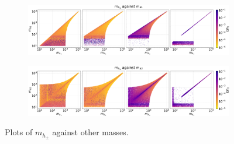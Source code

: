 \documentclass[12pt]{article}
\begin{document}
\begin{figure}[H]
    \begin{subfigure}[b]{\columnwidth}
      \centering
      \includegraphics[width=1\columnwidth]{4plot/MDP_MD1.pdf}
    \end{subfigure}

    \begin{subfigure}[b]{\columnwidth}
      \centering
      \includegraphics[width=1\columnwidth]{4plot/MDP_MD2.pdf}
    \end{subfigure}
    \caption{Plots of $m_{h_\pm}$ against other masses.}
\end{figure}
\end{document}
